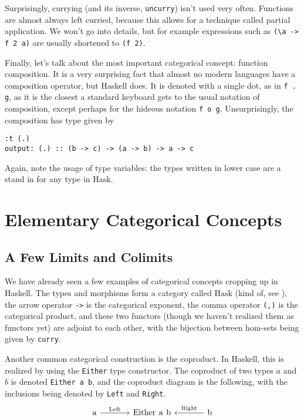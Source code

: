 \documentclass[11pt]{article}
\theoremstyle{nonumberplain}
\newcommand{\Hask}{\mathrm{Hask}}
\newcommand*\lsin{\lstinline}
\newcommand*\lsmath[1]{\text{\lstinline|#1|}}
\begin{document}
Surprisingly, currying (and its inverse, \lsin|uncurry|) isn't used very often. Functions are almost always left curried, because this allows for a technique called partial application. We won't go into details, but for example expressions such as \lsin|(\a -> f 2 a)| are usually shortened to \lsin|(f 2)|.

Finally, let's talk about the most important categorical concept: function composition. It is a very surprising fact that almost no modern languages have a composition operator, but Haskell does. It is denoted with a single dot, as in \lsin|f . g|, as it is the closest a standard keyboard gets to the usual notation of composition, except perhaps for the hideous notation \lsin|f o g|. Unsurprisingly, the composition has type given by
\begin{lstlisting}
:t (.)
output: (.) :: (b -> c) -> (a -> b) -> a -> c
\end{lstlisting}

Again, note the usage of type variables: the types written in lower case are a stand in for any type in $\Hask$.


\section{Elementary Categorical Concepts}

\subsection{A Few Limits and Colimits}\label{limcolim}

We have already seen a few examples of categorical concepts cropping up in Haskell. The types and morphisms form a category called $\Hask$ (kind of, see \cite{haskisnotcat}), the arrow operator \lsin|->| is the categorical exponent, the comma operator \lsin|(,)| is the categorical product, and these two functors (though we haven't realized them as functors yet) are adjoint to each other, with the bijection between hom-sets being given by \lsin|curry|.

Another common categorical construction is the coproduct. In Haskell, this is realized by using the \lsin|Either| type constructor. The coproduct of two types $a$ and $b$ is denoted \lsin|Either a b|, and the coproduct diagram is the following, with the inclusions being denoted by \lsin|Left| and \lsin|Right|.
\begin{equation}
\begin{tikzcd}[column sep = large]
\lsmath{a} \arrow[r, "\lsmath{Left}"] & \lsmath{Either a b} & \lsmath{b} \arrow[l, "\lsmath{Right}"']
\end{tikzcd}
\end{equation}
\end{document}
